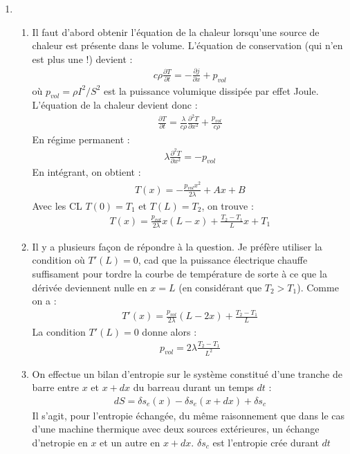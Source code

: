 \begin{correction}

\begin{enumerate}

\item

\begin{enumerate}

	\item Il faut d'abord obtenir l'équation de la chaleur lorsqu'une source de chaleur est présente dans le volume. L'équation de conservation (qui n'en est plus une !) devient :
	\begin{align*}
		c\rho\frac{\partial T}{\partial t} = -\frac{\partial j}{\partial x} + p_{vol}
	\end{align*}
	où $p_{vol} = \rho I^2/S^2$ est la puissance volumique dissipée par effet Joule. 
	L'équation de la chaleur devient donc :
	\begin{align*}
		\frac{\partial T}{\partial t} = \frac{\lambda}{c\rho}\frac{\partial^2 T}{\partial x^2} + \frac{p_{vol}}{c\rho}
	\end{align*}	
	En régime permanent :
	\begin{align*}
	  \lambda\frac{\partial^2 T}{\partial x^2} = - p_{vol}
	\end{align*}	
	En intégrant, on obtient :
	\begin{align*}
		T(x) = -\frac{p_{vol}x^2}{2\lambda}+Ax+B
	\end{align*}
	Avec les CL $T(0)=T_1$ et $T(L)=T_2$, on trouve :
	\begin{align*}
		T(x) = \frac{p_{vol}}{2\lambda}x(L-x)+\frac{T_2-T_1}{L}x+T_1
	\end{align*}
	\item Il y a plusieurs façon de répondre à la question. Je préfère utiliser la condition où $T'(L)=0$, cad que la puissance électrique chauffe suffisament pour tordre la courbe de température de sorte à ce que la dérivée deviennent nulle en $x=L$ (en considérant que $T_2>T_1$).
	Comme on a :
	\begin{align*}
		T'(x) = \frac{p_{vol}}{2\lambda}(L-2x)+\frac{T_2-T_1}{L}
	\end{align*}
	La condition $T'(L)=0$ donne alors : 
	\begin{align*}
		p_{vol} = 2\lambda\frac{T_2-T_1}{L^2}
	\end{align*}
	
	\item On effectue un bilan d'entropie sur le système constitué d'une tranche de barre entre $x$ et $x+dx$ du barreau durant un temps $dt$ :
	\begin{align*}
		dS = \delta s_e(x) - \delta s_e(x+dx) +\delta s_c
	\end{align*}
Il s'agit, pour l'entropie échangée, du même raisonnement que dans le cas d'une machine thermique avec deux sources extérieures, un échange d'netropie en $x$ et un autre en $x+dx$. $\delta s_c$ est l'entropie crée durant $dt$


\end{enumerate}
\end{enumerate}
\end{correction}
